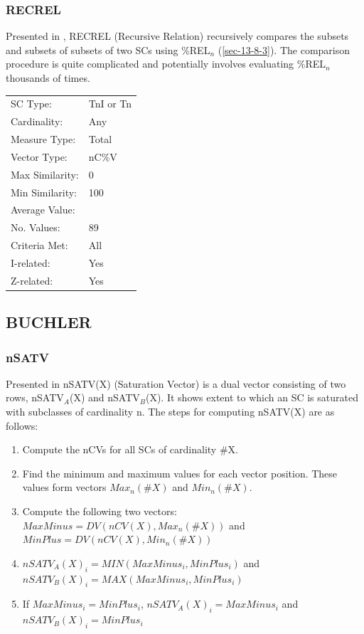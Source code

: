 \documentclass{article}
\begin{document}
\subsubsection{RECREL}
\label{sec-13-8-5}

Presented in \citet{Castren1994}, RECREL (Recursive Relation)
recursively compares the subsets and subsets of subsets of two SCs
using \%REL$_{n}$ (\ref{sec-13-8-3}). The comparison procedure is quite
complicated and potentially involves evaluating \%REL$_{n}$ thousands of
times.

\begin{center}
\begin{tabular}{ll}
 SC Type:         &  TnI or Tn  \\
 Cardinality:     &  Any        \\
 Measure Type:    &  Total      \\
 Vector Type:     &  nC\%V      \\
 Max Similarity:  &  0          \\
 Min Similarity:  &  100        \\
 Average Value:   &             \\
 No. Values:      &  89         \\
 Criteria Met:    &  All        \\
 I-related:       &  Yes        \\
 Z-related:       &  Yes        \\
\end{tabular}
\end{center}
\subsection{BUCHLER}
\label{sec-13-9}
\subsubsection{nSATV}
\label{sec-13-9-1}

Presented in \citet[chap. 2.3]{Buchler1997} nSATV(X) (Saturation
Vector) is a dual vector consisting of two rows, nSATV$_{A}$(X) and
nSATV$_{B}$(X). It shows extent to which an SC is saturated with
subclasses of cardinality n. The steps for computing nSATV(X) are
as follows:

\begin{enumerate}
\item Compute the nCVs for all SCs of cardinality \#X.
\item Find the minimum and maximum values for each vector position. These
   values form vectors $Max_{n}(\#X)$ and $Min_{n}(\#X)$.
\item Compute the following two vectors:
   $MaxMinus=DV(nCV(X),Max_{n}(\#X))$ and $MinPlus=DV(nCV(X),Min_{n}(\#X))$
\item $nSATV_{A}(X)_{i}=MIN(MaxMinus_{i},MinPlus_{i})$ and
   $nSATV_{B}(X)_{i}=MAX(MaxMinus_{i},MinPlus_{i})$
\item If $MaxMinus_{i}=MinPlus_{i}$, $nSATV_{A}(X)_{i}=MaxMinus_{i}$
   and $nSATV_{B}(X)_{i}=MinPlus_{i}$
\end{enumerate}
\end{document}
